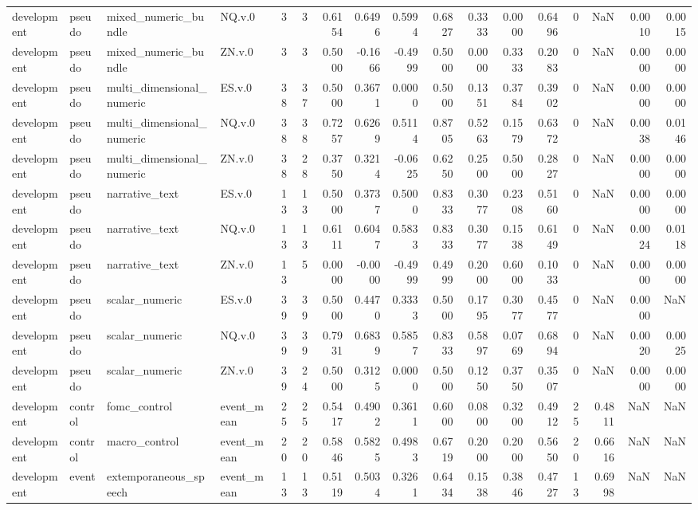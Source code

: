 \begin{tabular}{llllrrrrrrrrrrrrr}
development & pseudo & mixed_numeric_bundle & NQ.v.0 & 3 & 3 & 0.6154 & 0.6496 & 0.5994 & 0.6827 & 0.3333 & 0.0000 & 0.6496 & 0 & NaN & 0.0010 & 0.0015 \\
development & pseudo & mixed_numeric_bundle & ZN.v.0 & 3 & 3 & 0.5000 & -0.1666 & -0.4999 & 0.5000 & 0.0000 & 0.3333 & 0.2083 & 0 & NaN & 0.0000 & 0.0000 \\
development & pseudo & multi_dimensional_numeric & ES.v.0 & 38 & 37 & 0.5000 & 0.3671 & 0.0000 & 0.5000 & 0.1351 & 0.3784 & 0.3902 & 0 & NaN & 0.0000 & 0.0000 \\
development & pseudo & multi_dimensional_numeric & NQ.v.0 & 38 & 38 & 0.7257 & 0.6269 & 0.5114 & 0.8705 & 0.5263 & 0.1579 & 0.6372 & 0 & NaN & 0.0038 & 0.0146 \\
development & pseudo & multi_dimensional_numeric & ZN.v.0 & 38 & 28 & 0.3750 & 0.3214 & -0.0625 & 0.6250 & 0.2500 & 0.5000 & 0.2827 & 0 & NaN & 0.0000 & 0.0000 \\
development & pseudo & narrative_text & ES.v.0 & 13 & 13 & 0.5000 & 0.3737 & 0.5000 & 0.8333 & 0.3077 & 0.2308 & 0.5160 & 0 & NaN & 0.0000 & 0.0000 \\
development & pseudo & narrative_text & NQ.v.0 & 13 & 13 & 0.6111 & 0.6047 & 0.5833 & 0.8333 & 0.3077 & 0.1538 & 0.6149 & 0 & NaN & 0.0024 & 0.0118 \\
development & pseudo & narrative_text & ZN.v.0 & 13 & 5 & 0.0000 & -0.0000 & -0.4999 & 0.4999 & 0.2000 & 0.6000 & 0.1033 & 0 & NaN & 0.0000 & 0.0000 \\
development & pseudo & scalar_numeric & ES.v.0 & 39 & 39 & 0.5000 & 0.4470 & 0.3333 & 0.5000 & 0.1795 & 0.3077 & 0.4577 & 0 & NaN & 0.0000 & NaN \\
development & pseudo & scalar_numeric & NQ.v.0 & 39 & 39 & 0.7931 & 0.6839 & 0.5857 & 0.8333 & 0.5897 & 0.0769 & 0.6894 & 0 & NaN & 0.0020 & 0.0025 \\
development & pseudo & scalar_numeric & ZN.v.0 & 39 & 24 & 0.5000 & 0.3125 & 0.0000 & 0.5000 & 0.1250 & 0.3750 & 0.3507 & 0 & NaN & 0.0000 & 0.0000 \\
development & control & fomc_control & event_mean & 25 & 25 & 0.5417 & 0.4902 & 0.3611 & 0.6000 & 0.0800 & 0.3200 & 0.4912 & 25 & 0.4811 & NaN & NaN \\
development & control & macro_control & event_mean & 20 & 20 & 0.5846 & 0.5825 & 0.4983 & 0.6719 & 0.2000 & 0.2000 & 0.5650 & 20 & 0.6616 & NaN & NaN \\
development & event & extemporaneous_speech & event_mean & 13 & 13 & 0.5119 & 0.5034 & 0.3261 & 0.6434 & 0.1538 & 0.3846 & 0.4727 & 13 & 0.6998 & NaN & NaN \\

\end{tabular}

